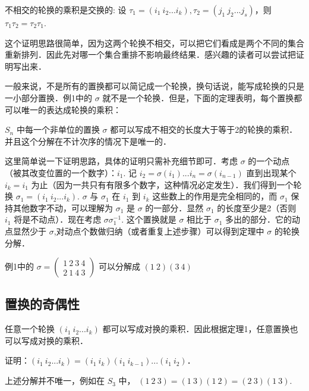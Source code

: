 \begin{lemma}{}
不相交的轮换的乘积是交换的: 设 $\tau_1=(i_1\ i_2...i_k), \tau_2=(j_1\ j_2...j_s)$，则 $\tau_1\tau_2=\tau_2\tau_1$.
\end{lemma}
这个证明思路很简单，因为这两个轮换不相交，可以把它们看成是两个不同的集合重新排列．因此先对哪一个集合重排不影响最终结果．感兴趣的读者可以尝试把证明写出来．

一般来说，不是所有的置换都可以简记成一个轮换，换句话说，能写成轮换的只是一小部分置换．例1中的 $\sigma$ 就不是一个轮换．但是，下面的定理表明，每个置换都可以唯一的表达成轮换的乘积：
\begin{theorem}{}
$S_n$ 中每一个非单位的置换 $\sigma$ 都可以写成不相交的长度大于等于2的轮换的乘积．并且这个分解在不计次序的情况下是唯一的．
\end{theorem}
这里简单说一下证明思路，具体的证明只需补充细节即可．考虑 $\sigma$ 的一个动点（被其改变位置的一个数字）：$i_1$. 记 $i_2=\sigma(i_1)...i_n=\sigma(i_{n-1})$ 直到出现某个 $i_k=i_1$ 为止（因为一共只有有限多个数字，这种情况必定发生）．我们得到一个轮换 $\sigma_1=(i_1\ i_2...i_k)$. $\sigma$ 与 $\sigma_1$ 在 $i_1$ 到 $i_k$ 这些数上的作用是完全相同的，而 $\sigma_1$ 保持其他数字不动，可以理解为 $\sigma_1$ 是 $\sigma$ 的一部分．显然 $\sigma_1$ 的长度至少是2（否则 $i_1$ 将是不动点）．现在考虑 $\sigma\sigma_1^{-1}$. 这个置换就是 $\sigma$ 相比于 $\sigma_1$ 多出的部分．它的动点显然少于 $\sigma$,对动点个数做归纳（或者重复上述步骤）可以得到定理中 $\sigma$ 的轮换分解．

\begin{example}{}
例1中的 $\sigma=\begin{pmatrix}
1\ 2\ 3\ 4\\ 2\ 1\ 4\ 3
\end{pmatrix}$ 可以分解成 $(1\ 2)(3\ 4)$
\end{example}

\subsection{置换的奇偶性}

\begin{lemma}{}
任意一个轮换 $(i_1\ i_2...i_k)$ 都可以写成对换的乘积．因此根据定理1，任意置换也可以写成对换的乘积．
\end{lemma}
证明：$(i_1\ i_2...i_k)=(i_1\ i_k)(i_1\ i_{k-1})...(i_1\ i_2)$．

\begin{example}{}
上述分解并不唯一，例如在 $S_3$ 中，
$(1\ 2\ 3)=(1\ 3)(1\ 2)=(2\ 3)(1\ 3)$.
\end{example}

